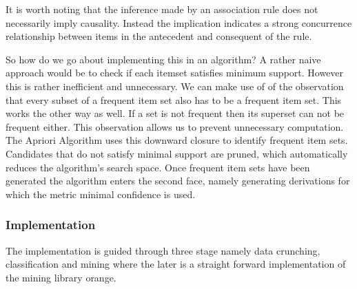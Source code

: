 It is worth noting that the inference made by an association rule does not necessarily imply causality. Instead the implication indicates a strong concurrence relationship between items in the antecedent and consequent of the rule. 

So how do we go about implementing this in an algorithm? A rather naive approach would be to check if each itemset satisfies minimum support. However this is rather inefficient and unnecessary. We can make use of of the observation that every subset of a frequent item set also has to be a frequent item set. This works the other way as well. If a set is not frequent then its superset can not be frequent either. This observation allows us to prevent unnecessary computation. The Apriori Algorithm uses this downward closure to identify frequent item sets. Candidates that do not satisfy minimal support are pruned, which automatically reduces the algorithm's search space. Once frequent item sets have been generated the algorithm enters the second face, namely generating derivations for which the metric minimal confidence is used. 

\subsubsection{Implementation}

The implementation is guided through three stage namely data crunching, classification and  mining where the later is a straight forward implementation of the mining library orange. \\



